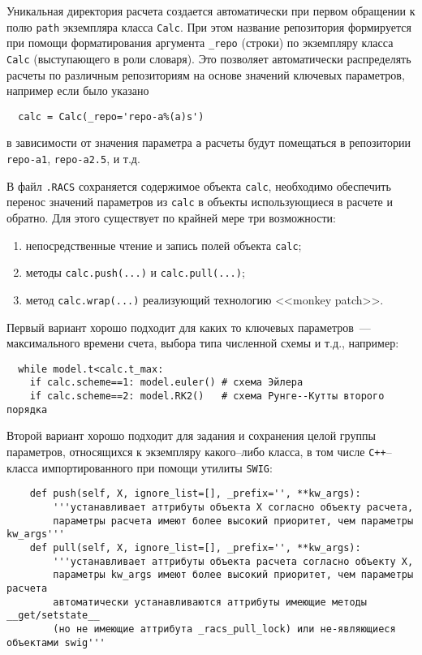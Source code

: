 Уникальная директория расчета создается автоматически при первом обращении к полю \verb'path' экземпляра класса \verb'Calc'. 
При этом название репозитория формируется при помощи форматирования аргумента \verb'_repo' (строки) по экземпляру класса \verb'Calc'
(выступающего в роли словаря). Это позволяет автоматически распределять расчеты по различным репозиториям на основе значений
ключевых параметров, например если было указано
\begin{verbatim}
  calc = Calc(_repo='repo-a%(a)s')
\end{verbatim}
в зависимости от значения параметра \verb'a' расчеты будут помещаться в репозитории \verb'repo-a1',
\verb'repo-a2.5', и т.д.

В файл \verb'.RACS' сохраняется содержимое объекта \verb'calc',
необходимо обеспечить перенос значений параметров из \verb'calc' в объекты использующиеся в расчете и обратно.
Для этого существует по крайней мере три возможности:
\begin{enumerate}
\item непосредственные чтение и запись полей объекта \verb'calc';
\item методы \verb'calc.push(...)' и \verb'calc.pull(...)';
\item метод \verb'calc.wrap(...)' реализующий технологию <<monkey patch>>.
\end{enumerate}

Первый вариант хорошо подходит для каких то ключевых параметров~--- максимального времени счета,
выбора типа численной схемы и т.д., например:
\begin{verbatim}
  while model.t<calc.t_max:
    if calc.scheme==1: model.euler() # схема Эйлера
    if calc.scheme==2: model.RK2()   # схема Рунге--Кутты второго порядка
\end{verbatim}

Второй вариант хорошо подходит для задания и сохранения целой группы параметров, относящихся к экземпляру какого--либо класса,
в том числе \verb'C++'--класса импортированного при помощи утилиты \verb'SWIG':
\begin{verbatim}
    def push(self, X, ignore_list=[], _prefix='', **kw_args):
        '''устанавливает аттрибуты объекта X согласно объекту расчета, 
        параметры расчета имеют более высокий приоритет, чем параметры kw_args'''
    def pull(self, X, ignore_list=[], _prefix='', **kw_args):
        '''устанавливает аттрибуты объекта расчета согласно объекту X, 
        параметры kw_args имеют более высокий приоритет, чем параметры расчета
        автоматически устанавливаются аттрибуты имеющие методы __get/setstate__ 
        (но не имеющие аттрибута _racs_pull_lock) или не-являющиеся объектами swig'''
\end{verbatim}

